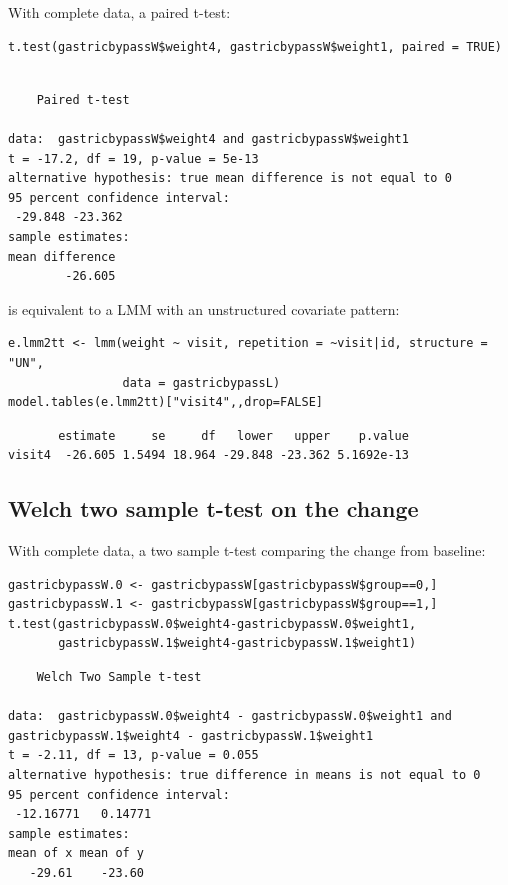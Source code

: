 \documentclass[12pt]{article}
\begin{document}
With complete data, a paired t-test:
\lstset{language=r,label= ,caption= ,captionpos=b,numbers=none}
\begin{lstlisting}
t.test(gastricbypassW$weight4, gastricbypassW$weight1, paired = TRUE)
\end{lstlisting}

\begin{verbatim}

	Paired t-test

data:  gastricbypassW$weight4 and gastricbypassW$weight1
t = -17.2, df = 19, p-value = 5e-13
alternative hypothesis: true mean difference is not equal to 0
95 percent confidence interval:
 -29.848 -23.362
sample estimates:
mean difference 
        -26.605
\end{verbatim}

is equivalent to a LMM with an unstructured covariate pattern:
\lstset{language=r,label= ,caption= ,captionpos=b,numbers=none}
\begin{lstlisting}
e.lmm2tt <- lmm(weight ~ visit, repetition = ~visit|id, structure = "UN",
                data = gastricbypassL)
model.tables(e.lmm2tt)["visit4",,drop=FALSE]
\end{lstlisting}

\begin{verbatim}
       estimate     se     df   lower   upper    p.value
visit4  -26.605 1.5494 18.964 -29.848 -23.362 5.1692e-13
\end{verbatim}


\clearpage

\subsection{Welch two sample t-test on the change}
\label{sec:orgebdafcb}

With complete data, a two sample t-test comparing the change from baseline:
\lstset{language=r,label= ,caption= ,captionpos=b,numbers=none}
\begin{lstlisting}
gastricbypassW.0 <- gastricbypassW[gastricbypassW$group==0,]
gastricbypassW.1 <- gastricbypassW[gastricbypassW$group==1,]
t.test(gastricbypassW.0$weight4-gastricbypassW.0$weight1,
       gastricbypassW.1$weight4-gastricbypassW.1$weight1)
\end{lstlisting}

\begin{verbatim}
	Welch Two Sample t-test

data:  gastricbypassW.0$weight4 - gastricbypassW.0$weight1 and gastricbypassW.1$weight4 - gastricbypassW.1$weight1
t = -2.11, df = 13, p-value = 0.055
alternative hypothesis: true difference in means is not equal to 0
95 percent confidence interval:
 -12.16771   0.14771
sample estimates:
mean of x mean of y 
   -29.61    -23.60
\end{verbatim}
\end{document}
